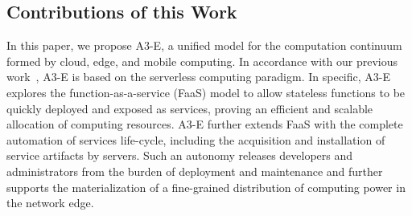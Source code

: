 %


\subsection{Contributions of this Work}

In this paper, we propose A3-E, a unified model for the computation continuum formed by cloud, edge, and mobile computing. In accordance with our previous work~\cite{GarrigaMendonca2017}, A3-E is based on the serverless computing paradigm. In specific, A3-E explores the function-as-a-service (FaaS) model to allow stateless functions to be quickly deployed and exposed as services, proving an efficient and scalable allocation of computing resources. A3-E further extends FaaS with the complete automation of services life-cycle, including the acquisition and installation of service artifacts by servers. Such an autonomy releases developers and administrators from the burden of deployment and maintenance and further supports the materialization of a fine-grained distribution of computing power in the network edge.

